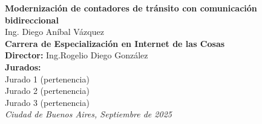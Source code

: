 \begin{titlepage}

    \begin{flushright}
        \setlength{\rightskip}{-2cm} %
        \vspace*{7.5cm} %

        {\bfseries\fontsize{33pt}{40pt}\selectfont
      Modernización de contadores de tránsito con comunicación bidireccional} \\[1.5cm]

        {\fontsize{20pt}{25pt}\selectfont
        Ing. Diego Aníbal Vázquez} \\[1cm]

        {\fontsize{15pt}{20pt}\selectfont
        \textbf{Carrera de Especialización en Internet de las Cosas}
        } \\[2cm]

        {\fontsize{11pt}{15pt}\selectfont
        \textbf{Director:} Ing.Rogelio Diego González} \\[1cm]

        {\fontsize{11pt}{15pt}\selectfont
        \textbf{Jurados:}} \\[0.5cm]
        {\fontsize{11pt}{15pt}\selectfont
        Jurado 1 (pertenencia)} \\ 
        {\fontsize{11pt}{15pt}\selectfont
        Jurado 2 (pertenencia)} \\ 
        {\fontsize{11pt}{15pt}\selectfont
        Jurado 3 (pertenencia)} \\[2cm]

        {\itshape\fontsize{10pt}{12pt}\selectfont
        Ciudad de Buenos Aires, Septiembre de 2025} %
    \end{flushright}
\end{titlepage}
